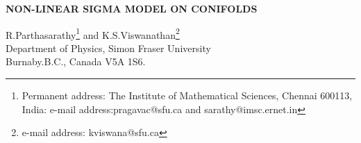 \documentclass[a4paper,12pt]{article}
\begin{document}
\begin{center}
{\bf{NON-LINEAR SIGMA MODEL ON CONIFOLDS}}

\vspace{1.0cm}

R.Parthasarathy{\footnote{Permanent address: The Institute of Mathematical 
Sciences, Chennai 600113, India: e-mail address:pragavac@sfu.ca and 
sarathy@imsc.ernet.in}} and 
K.S.Viswanathan{\footnote{e-mail address: kviswana@sfu.ca}} \\
Department of Physics, Simon Fraser University \\
Burnaby.B.C., Canada V5A 1S6. \\

\end{center}

\vspace{0.5cm}
\end{document}
